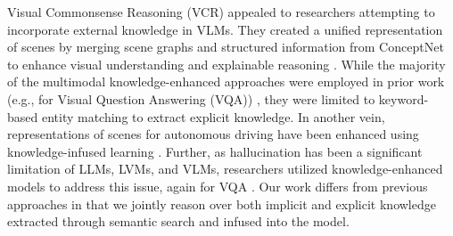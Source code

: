 Visual Commonsense Reasoning (VCR) 
appealed to researchers attempting to incorporate external knowledge in VLMs.  
They created a unified representation of scenes by merging scene graphs and structured information from ConceptNet to enhance visual understanding and explainable reasoning \cite{Zareian2020-vw,Pan2022-jd}. 
While the majority of the multimodal knowledge-enhanced 
approaches were employed in prior work (e.g., for Visual Question Answering (VQA)) \cite{Garderes2020-gx,Marino2021-sn,Wu2022-lj}, they were limited to keyword-based entity matching to extract explicit knowledge. In another vein, representations of scenes for autonomous driving have been enhanced using knowledge-infused learning \cite{wickramarachchi2022knowledge,wickramarachchi2021knowledge}.
Further, as hallucination has been a significant limitation of LLMs, LVMs, and VLMs, researchers utilized knowledge-enhanced models to address this issue, again for VQA \cite{Chen2023-mf}. Our work differs from previous approaches in that we jointly reason over both implicit and explicit knowledge extracted through semantic search and infused into the model. 

